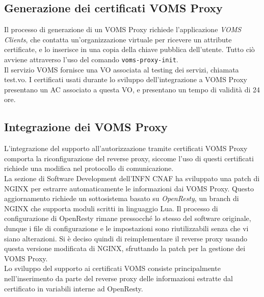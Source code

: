 \subsection{Generazione dei certificati VOMS Proxy}
Il processo di generazione di un VOMS Proxy richiede l'applicazione \textit{VOMS Clients}, che contatta un'organizzazione virtuale per ricevere un attribute 
certificate, e lo inserisce in una copia della chiave pubblica dell'utente. Tutto ciò avviene attraverso l'uso del comando \texttt{voms-proxy-init}. 
\\Il servizio VOMS fornisce una VO associata al testing dei servizi, chiamata test.vo. I certificati usati durante lo sviluppo 
dell'integrazione a VOMS Proxy presentano un AC associato a questa VO, e presentano un tempo di validità di 24 ore.   

\subsection{Integrazione dei VOMS Proxy}
L'integrazione del supporto all'autorizzazione tramite certificati VOMS Proxy comporta la riconfigurazione del reverse proxy, 
siccome l'uso di questi certificati richiede una modifica nel protocollo di comunicazione. 
\\ La sezione di Software Development dell'INFN CNAF ha sviluppato una patch di NGINX per estrarre automaticamente le informazioni dai VOMS Proxy.
Questo aggiornamento richiede un sottosistema basato su \textit{OpenResty}, un branch di NGINX che supporta moduli scritti in linguaggio Lua. 
Il processo di configurazione di OpenResty
 rimane pressocché lo stesso del software originale, dunque i file di configurazione e le impostazioni sono riutilizzabili 
senza che vi siano alterazioni. 
Si è deciso quindi di reimplementare il reverse proxy usando questa versione modificata di NGINX, sfruttando la patch per la gestione dei VOMS Proxy. 
\\ Lo sviluppo del supporto ai certificati VOMS consiste principalmente nell'inserimento da parte del reverse proxy 
delle informazioni estratte dal certificato in variabili interne ad OpenResty. 


